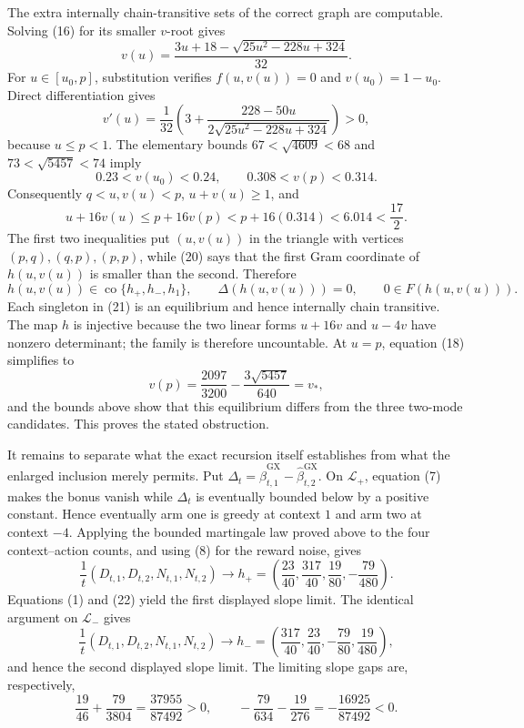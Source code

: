 The extra internally chain-transitive sets of the correct graph are computable.  Solving (16) for its smaller \(v\)-root gives
\[
 v(u)=\frac{3u+18-\sqrt{25u^2-228u+324}}{32}. \tag{18}
\]
For \(u\in[u_0,p]\), substitution verifies \(f(u,v(u))=0\) and \(v(u_0)=1-u_0\).  Direct differentiation gives
\[
 v'(u)=\frac1{32}\left(3+\frac{228-50u}{2\sqrt{25u^2-228u+324}}\right)>0, \tag{19}
\]
because \(u\leq p<1\).  The elementary bounds \(67<\sqrt{4609}<68\) and \(73<\sqrt{5457}<74\) imply
\[
 0.23<v(u_0)<0.24,\qquad 0.308<v(p)<0.314.
\]
Consequently \(q<u,v(u)<p\), \(u+v(u)\geq1\), and
\[
 u+16v(u)\leq p+16v(p)<p+16(0.314)<6.014<\frac{17}{2}. \tag{20}
\]
The first two inequalities put \((u,v(u))\) in the triangle with vertices \((p,q),(q,p),(p,p)\), while (20) says that the first Gram coordinate of \(h(u,v(u))\) is smaller than the second.  Therefore
\[
 h(u,v(u))\in\operatorname{co}\{h_+,h_-,h_1\},\qquad
 \Delta(h(u,v(u)))=0,\qquad 0\in F(h(u,v(u))). \tag{21}
\]
Each singleton in (21) is an equilibrium and hence internally chain transitive.  The map \(h\) is injective because the two linear forms \(u+16v\) and \(u-4v\) have nonzero determinant; the family is therefore uncountable.  At \(u=p\), equation (18) simplifies to
\[
 v(p)=\frac{2097}{3200}-\frac{3\sqrt{5457}}{640}=v_*,
\]
and the bounds above show that this equilibrium differs from the three two-mode candidates.  This proves the stated obstruction.

It remains to separate what the exact recursion itself establishes from what the enlarged inclusion merely permits.  Put \(\Delta_t=\widehat\beta^{\mathrm{GX}}_{t,1}-\widehat\beta^{\mathrm{GX}}_{t,2}\).  On \(\mathcal L_+\), equation (7) makes the bonus vanish while \(\Delta_t\) is eventually bounded below by a positive constant.  Hence eventually arm one is greedy at context \(1\) and arm two at context \(-4\).  Applying the bounded martingale law proved above to the four context--action counts, and using (8) for the reward noise, gives
\[
 \frac1t(D_{t,1},D_{t,2},N_{t,1},N_{t,2})
 \longrightarrow h_+=\left(\frac{23}{40},\frac{317}{40},\frac{19}{80},-\frac{79}{480}\right). \tag{22}
\]
Equations (1) and (22) yield the first displayed slope limit.  The identical argument on \(\mathcal L_-\) gives
\[
 \frac1t(D_{t,1},D_{t,2},N_{t,1},N_{t,2})
 \longrightarrow h_-=\left(\frac{317}{40},\frac{23}{40},-\frac{79}{80},\frac{19}{480}\right), \tag{23}
\]
and hence the second displayed slope limit.  The limiting slope gaps are, respectively,
\[
 \frac{19}{46}+\frac{79}{3804}=
 \frac{37955}{87492}>0,
 \qquad
 -\frac{79}{634}-\frac{19}{276}=-\frac{16925}{87492}<0. \tag{24}
\]

